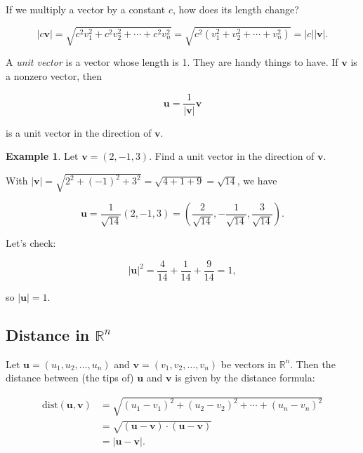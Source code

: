 \documentclass[
]{book}
\theoremstyle{definition}
\theoremstyle{definition}
\newtheorem{example}{Example}[chapter]
\theoremstyle{definition}
\theoremstyle{definition}
\theoremstyle{remark}
\begin{document}
If we multiply a vector by a constant \(c\), how does its length change?

\[|c\mathbf{v}|=\sqrt{c^2v_1^2+c^2v_2^2+\cdots+c^2v_n^2}=\sqrt{c^2(v_1^2+v_2^2+\cdots +v_n^2)}=|c||\mathbf{v}|.\]

A \emph{unit vector} is a vector whose length is 1. They are handy things to have. If \(\mathbf{v}\) is a nonzero vector, then

\[\mathbf{u}=\frac{1}{|\mathbf{v}|}\mathbf{v}\]

is a unit vector in the direction of \(\mathbf{v}\).

\begin{examplebox}

\begin{example}
Let \(\mathbf{v}=(2,-1,3).\) Find a unit vector in the direction of \(\mathbf{v}.\)

With \(|\mathbf{v}|=\sqrt{2^2+(-1)^2+3^2}=\sqrt{4+1+9}=\sqrt{14}\), we have

\[\mathbf{u}=\frac{1}{\sqrt{14}}(2,-1,3)=\left(\frac{2}{\sqrt{14}},-\frac{1}{\sqrt{14}},\frac{3}{\sqrt{14}}\right).\]

Let's check:

\[|\mathbf{u}|^2=\frac{4}{14}+\frac{1}{14}+\frac{9}{14}=1,\]

so \(|\mathbf{u}|=1\).
\end{example}

\end{examplebox}

\subsection*{\texorpdfstring{Distance in \(\mathbb{R}^n\)}{Distance in \textbackslash mathbb\{R\}\^{}n}}\label{distance-in-mathbbrn}

Let \(\mathbf{u}=(u_1,u_2,\dots,u_n)\) and \(\mathbf{v}=(v_1,v_2,\dots,v_n)\) be vectors in \(\mathbb{R}^n\). Then the distance between (the tips of) \(\mathbf{u}\) and \(\mathbf{v}\) is given by the distance formula:

\begin{align*}
\text{dist}(\mathbf{u},\mathbf{v})&=\sqrt{(u_1-v_1)^2+(u_2-v_2)^2+\cdots+(u_n-v_n)^2}\\
&=\sqrt{(\mathbf{u}-\mathbf{v})\cdot (\mathbf{u}-\mathbf{v})}\\
&=|\mathbf{u}-\mathbf{v}|.
\end{align*}
\end{document}
